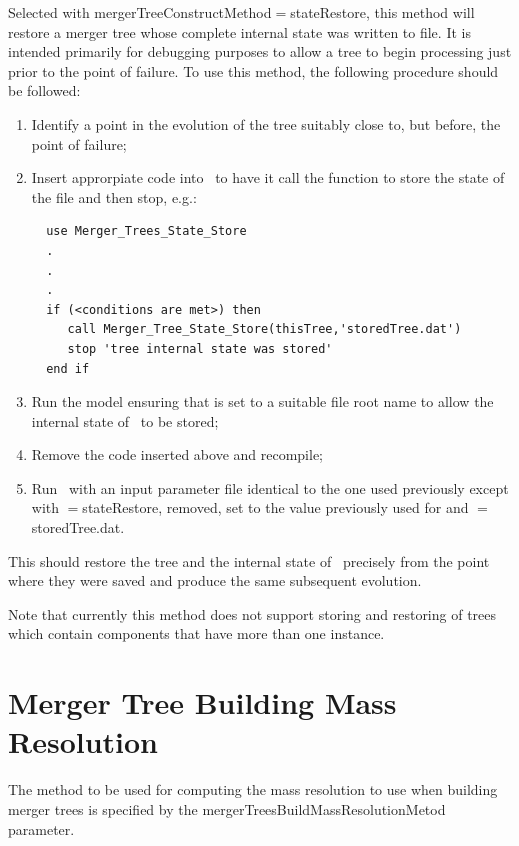 Selected with {\normalfont \ttfamily mergerTreeConstructMethod}$=${\normalfont \ttfamily stateRestore}, this method will restore a merger tree whose complete internal state was written to file. It is intended primarily for debugging purposes to allow a tree to begin processing just prior to the point of failure. To use this method, the following procedure should be followed:
\begin{enumerate}
 \item Identify a point in the evolution of the tree suitably close to, but before, the point of failure;
 \item Insert approrpiate code into \glc\ to have it call the function to store the state of the file and then stop, e.g.:
 \begin{verbatim}
  use Merger_Trees_State_Store
  .
  .
  .
  if (<conditions are met>) then
     call Merger_Tree_State_Store(thisTree,'storedTree.dat')
     stop 'tree internal state was stored'
  end if
 \end{verbatim}
 \item Run the model ensuring that {\normalfont \ttfamily [stateFileRoot]} is set to a suitable file root name to allow the internal state of \glc\ to be stored;
 \item Remove the code inserted above and recompile;
 \item Run \glc\ with an input parameter file identical to the one used previously except with {\normalfont \ttfamily [mergerTreeConstructMethod]}$=${\normalfont \ttfamily stateRestore}, {\normalfont \ttfamily [stateFileRoot]} removed, {\normalfont \ttfamily [stateRetrieveFileRoot]} set to the value previously used for {\normalfont \ttfamily [stateFileRoot]} and {\normalfont \ttfamily [mergerTreeStateStoreFile]}$=${\normalfont \ttfamily storedTree.dat}.
\end{enumerate}
This should restore the tree and the internal state of \glc\ precisely from the point where they were saved and produce the same subsequent evolution.

Note that currently this method does not support storing and restoring of trees which contain components that have more than one instance.

\section{Merger Tree Building Mass Resolution}\label{sec:MergerTreeBuildingMassResolution}

The method to be used for computing the mass resolution to use when building merger trees is specified by the {\normalfont \ttfamily mergerTreesBuildMassResolutionMetod} parameter.

